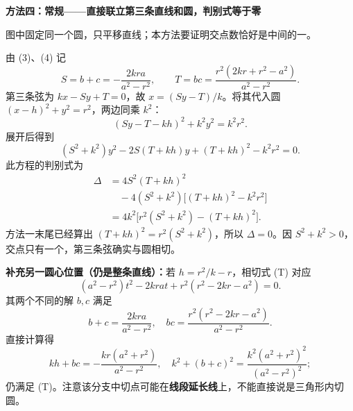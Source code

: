 \clearpage
\begin{proofbox}
\textbf{\textcolor{CProof}{方法四：常规——直接联立第三条直线和圆，判别式等于零}}

\begin{center}

\end{center}
图中固定同一个圆，只平移直线；本方法要证明交点数恰好是中间的一。

由 (3)、(4) 记
\[
S=b+c=-\frac{2kra}{a^2-r^2},\qquad
T=bc=\frac{r^2(2kr+r^2-a^2)}{a^2-r^2}.
\]
第三条弦为 $kx-Sy+T=0$，故 $x=(Sy-T)/k$。将其代入圆 $(x-h)^2+y^2=r^2$，两边同乘 $k^2$：
\[
(Sy-T-kh)^2+k^2y^2=k^2r^2.
\]
展开后得到
\[
(S^2+k^2)y^2-2S(T+kh)y+(T+kh)^2-k^2r^2=0.
\]
此方程的判别式为
\[
\begin{aligned}
\Delta&=4S^2(T+kh)^2\\
&\quad-4(S^2+k^2)\bigl[(T+kh)^2-k^2r^2\bigr]\\
&=4k^2\bigl[r^2(S^2+k^2)-(T+kh)^2\bigr].
\end{aligned}
\]
方法一末尾已经算出 $(T+kh)^2=r^2(S^2+k^2)$，所以 $\Delta=0$。因 $S^2+k^2>0$，交点只有一个，第三条弦确实与圆相切。

\end{proofbox}
\clearpage
\begin{proofbox}
\textbf{补充另一圆心位置（仍是整条直线）：}若 $h=r^2/k-r$，相切式 (T) 对应
\[
(a^2-r^2)t^2-2krat+r^2(r^2-2kr-a^2)=0.
\]
其两个不同的解 $b,c$ 满足
\[
 b+c=\frac{2kra}{a^2-r^2},\quad
 bc=\frac{r^2(r^2-2kr-a^2)}{a^2-r^2}.
\]
直接计算得
\[
kh+bc=-\frac{kr(a^2+r^2)}{a^2-r^2},\quad
k^2+(b+c)^2=\frac{k^2(a^2+r^2)^2}{(a^2-r^2)^2};
\]
仍满足 (T)。注意该分支中切点可能在\textbf{线段延长线}上，不能直接说是三角形内切圆。
\end{proofbox}
